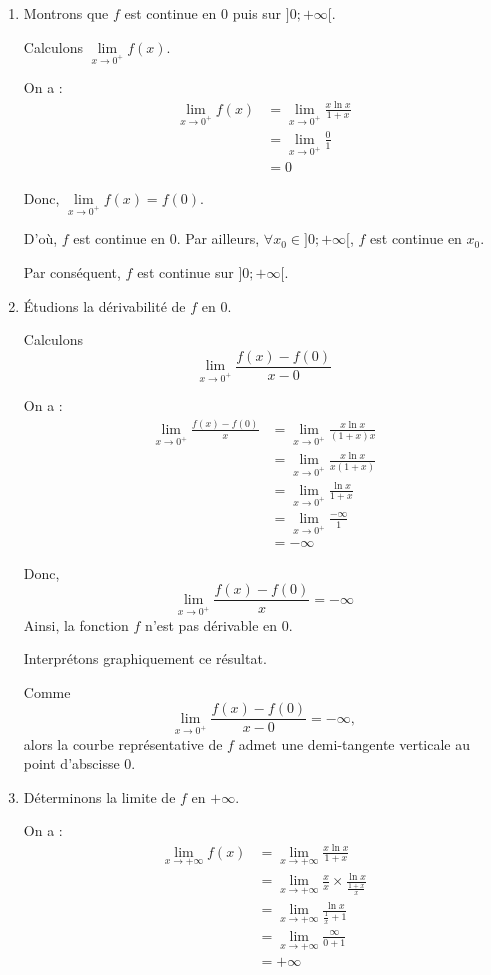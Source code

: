 \documentclass[12pt,a4paper]{article}
\begin{document}
\begin{enumerate}
    \item Montrons que $f$ est continue en 0 puis sur $]0 ; +\infty[$.

Calculons $\lim\limits_{x \to 0^+} f(x)$.

On a :
\[
\begin{aligned}
\lim\limits_{x \to 0^+} f(x) &= \lim\limits_{x \to 0^+} \frac{x \ln x}{1 + x} \\
&= \lim\limits_{x \to 0^+} \frac{0}{1} \\
&= 0
\end{aligned}
\]

Donc, $\lim\limits_{x \to 0^+} f(x) = f(0)$.

D'où, $f$ est continue en 0.
Par ailleurs, $\forall x_0 \in ]0 ; +\infty[$, $f$ est continue en $x_0$.

Par conséquent, $f$ est continue sur $]0 ; +\infty[$.

\item  Étudions la dérivabilité de $f$ en 0.

Calculons
\[
\lim\limits_{x \to 0^+} \frac{f(x) - f(0)}{x - 0}
\]

On a :
\[
\begin{aligned}
\lim\limits_{x \to 0^+} \frac{f(x) - f(0)}{x} &= \lim\limits_{x \to 0^+} \frac{x \ln x}{(1 + x) x} \\
&= \lim\limits_{x \to 0^+} \frac{x \ln x}{x(1 + x)} \\
&= \lim\limits_{x \to 0^+} \frac{\ln x}{1 + x} \\
&= \lim\limits_{x \to 0^+} \frac{-\infty}{1} \\
&= -\infty
\end{aligned}
\]

Donc,
\[
\lim\limits_{x \to 0^+} \frac{f(x) - f(0)}{x} = -\infty
\]
Ainsi, la fonction $f$ n'est pas dérivable en 0.

Interprétons graphiquement ce résultat.

Comme 
\[
\lim\limits_{x \to 0^+} \frac{f(x) - f(0)}{x - 0} = -\infty,
\]
alors la courbe représentative de $f$ admet une demi-tangente verticale au point d'abscisse 0.

\item Déterminons la limite de $f$ en $+\infty$.

On a :
\[
\begin{aligned}
\lim\limits_{x \to +\infty} f(x) &= \lim\limits_{x \to +\infty} \frac{x \ln x}{1 + x} \\
&= \lim\limits_{x \to +\infty} \frac{x}{x} \times \frac{\ln x}{\frac{1+x}{x}} \\
&= \lim\limits_{x \to +\infty} \frac{\ln x}{\frac{1}{x}+1} \\
&= \lim\limits_{x \to +\infty} \frac{\infty}{0+1} \\
&= +\infty
\end{aligned}
\]


\end{enumerate}
\end{document}
